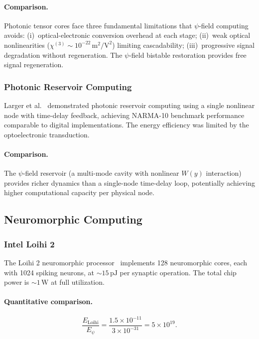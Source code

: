 \documentclass[11pt,twocolumn]{article}
\theoremstyle{definition}
\theoremstyle{remark}
\begin{document}
\paragraph{Comparison.} Photonic tensor cores face three fundamental
limitations that $\psi$-field computing avoids: (i)~optical-electronic
conversion overhead at each stage; (ii)~weak optical nonlinearities
($\chi^{(3)} \sim 10^{-22}\,\mathrm{m}^2/\mathrm{V}^2$) limiting
cascadability; (iii)~progressive signal degradation without
regeneration. The $\psi$-field bistable restoration provides free signal
regeneration.

\subsubsection{Photonic Reservoir Computing}

Larger et al.~\cite{Larger2012} demonstrated photonic reservoir
computing using a single nonlinear node with time-delay feedback,
achieving NARMA-10 benchmark performance comparable to digital
implementations. The energy efficiency was limited by the
optoelectronic transduction.

\paragraph{Comparison.} The $\psi$-field reservoir (a multi-mode cavity
with nonlinear $W(y)$ interaction) provides richer dynamics than a
single-node time-delay loop, potentially achieving higher computational
capacity per physical node.

\subsection{Neuromorphic Computing}

\subsubsection{Intel Loihi 2}

The Loihi 2 neuromorphic processor~\cite{Davies2018,Orchard2021}
implements 128 neuromorphic cores, each with 1024 spiking neurons, at
$\sim 15\,\mathrm{pJ}$ per synaptic operation. The total chip power is
$\sim 1\,\mathrm{W}$ at full utilization.

\paragraph{Quantitative comparison.}
\begin{equation}
\frac{E_{\mathrm{Loihi}}}{E_\psi} = \frac{1.5\times 10^{-11}}{3\times 10^{-31}} = 5\times 10^{19}.
\end{equation}
\end{document}
